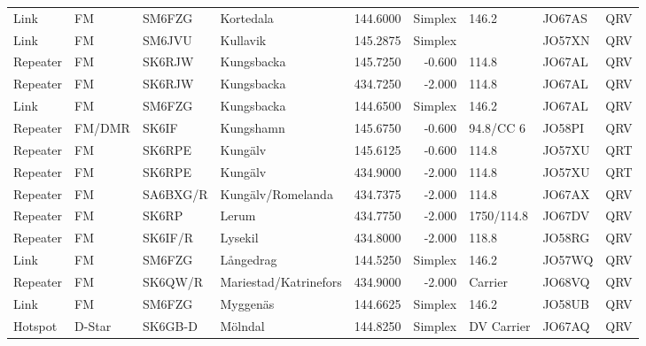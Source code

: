 \begin{landscape}
\begin{longtable}{llllrrlll}
	Link     & FM              & SM6FZG   & Kortedala             &     144.6000 &    Simplex & 146.2             & JO67AS      & QRV      \\
	Link     & FM              & SM6JVU   & Kullavik              &     145.2875 &    Simplex &                   & JO57XN      & QRV      \\
	Repeater & FM              & SK6RJW   & Kungsbacka            &     145.7250 &     -0.600 & 114.8             & JO67AL      & QRV      \\
	Repeater & FM              & SK6RJW   & Kungsbacka            &     434.7250 &     -2.000 & 114.8             & JO67AL      & QRV      \\
	Link     & FM              & SM6FZG   & Kungsbacka            &     144.6500 &    Simplex & 146.2             & JO67AL      & QRV      \\
	Repeater & FM/DMR          & SK6IF    & Kungshamn             &     145.6750 &     -0.600 & 94.8/CC 6         & JO58PI      & QRV      \\
	Repeater & FM              & SK6RPE   & Kungälv               &     145.6125 &     -0.600 & 114.8             & JO57XU      & QRT      \\
	Repeater & FM              & SK6RPE   & Kungälv               &     434.9000 &     -2.000 & 114.8             & JO57XU      & QRT      \\
	Repeater & FM              & SA6BXG/R & Kungälv/Romelanda     &     434.7375 &     -2.000 & 114.8             & JO67AX      & QRV      \\
	Repeater & FM              & SK6RP    & Lerum                 &     434.7750 &     -2.000 & 1750/114.8        & JO67DV      & QRV      \\
	Repeater & FM              & SK6IF/R  & Lysekil               &     434.8000 &     -2.000 & 118.8             & JO58RG      & QRV      \\
	Link     & FM              & SM6FZG   & Långedrag             &     144.5250 &    Simplex & 146.2             & JO57WQ      & QRV      \\
	Repeater & FM              & SK6QW/R  & Mariestad/Katrinefors &     434.9000 &     -2.000 & Carrier           & JO68VQ      & QRV      \\
	Link     & FM              & SM6FZG   & Myggenäs              &     144.6625 &    Simplex & 146.2             & JO58UB      & QRV      \\
	Hotspot  & D-Star          & SK6GB-D  & Mölndal               &     144.8250 &    Simplex & DV Carrier        & JO67AQ      & QRV      \\

\end{longtable}
\end{landscape}
